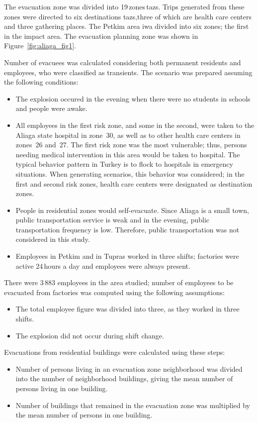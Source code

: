 The evacuation zone was divided into 19\,zones\,\glspl{taz}. Trips generated from these zones were directed to six destinations \glspl{taz},three of which are health care centers and three gathering places. The Petkim area iwa divided into six zones; the first in the impact area. The evacuation planning zone was shown in Figure~\ref{fig:aliaga_fig1}.

Number of evacuees was calculated considering both permanent residents and employees, who were classified as transients. The scenario was prepared assuming the following conditions:
%
\begin{itemize}\styleItemize
\item The explosion occured in the evening when there were no students in schools and people were awake.
%
\item All employees in the first risk zone, and some in the second, were taken to the Aliaga state hospital in zone~30, as well as to other health care centers in zones~26 and~27. The first risk zone was the most vulnerable; thus, persons needing medical intervention in this area would be taken to hospital. The typical behavior pattern in Turkey is to flock to hospitals in emergency situations. When generating scenarios, this behavior was considered; in the first and second risk zones, health care centers were designated as destination zones.
%
\item People in residential zones would self-evacuate. Since Aliaga is a small town, public transportation service is weak and in the evening, public transportation frequency is low. Therefore, public transportation was not considered in this study.
%
\item Employees in Petkim and in Tupras worked in three shifts; factories were active 24\,hours a day and employees were always present.
\end{itemize}

There were 3\,883 employees in the area studied; number of employees to be evacuated from factories was computed using the following assumptions:
%
\begin{itemize}\styleItemize
\item The total employee figure was divided into three, as they worked in three shifts.
%
\item The explosion did not occur during shift change.
\end{itemize}

Evacuations from residential buildings were calculated using these steps:
%
\begin{itemize}\styleItemize
\item Number of persons living in an evacuation zone neighborhood was divided into the number of neighborhood buildings, giving the mean number of persons living in one building.
%
\item Number of buildings that remained in the evacuation zone was multiplied by the mean number of persons in one building.
\end{itemize}

